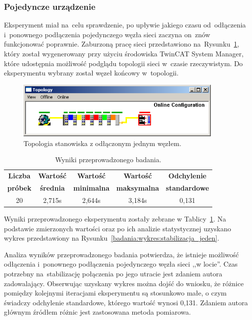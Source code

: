 \clearpage
\subsubsection{Pojedyncze urządzenie}
Eksperyment miał na~celu sprawdzenie, po upływie jakiego czasu od~odłączenia i~ponownego podłączenia pojedynczego węzła sieci zaczyna on~znów funkcjonować poprawnie. Zaburzoną pracę sieci przedstawiono na~Rysunku~\ref{one_slave}, który został wygenerowany przy użyciu środowiska TwinCAT System Manager, które udostępnia możliwość podglądu topologii sieci w~czasie rzeczywistym. Do eksperymentu wybrany został węzeł końcowy w~topologii.
\begin{figure}[!htb] 	\centering 	\includegraphics[width=0.9\textwidth]{images/topologyCXerror} \caption{Topologia stanowiska z odłączonym jednym węzłem.} \label{one_slave} \end{figure}

\begin{table}[!htb]
\begin{center}
\begin{tabular}{| c | c | c | c | c |}\hline
\textbf{Liczba} & \textbf{Wartość} & \textbf{Wartość} & \textbf{Wartość} & \textbf{Odchylenie} \\
\textbf{próbek} & \textbf{średnia} & \textbf{minimalna} & \textbf{maksymalna} & \textbf{standardowe} \\\hline\hline
20 & 2,715s & 2,644s & 3,184s & 0,131\\\hline
\end{tabular}
\end{center}
\vspace*{-6mm}
  \caption{Wyniki przeprowadzonego badania.}
	\label{badania:wyniki:stabilizacja_jeden}
\end{table}

\noindent Wyniki przeprowadzonego eksperymentu zostały zebrane w Tablicy~\ref{badania:wyniki:stabilizacja_jeden}. Na podstawie zmierzonych wartości oraz po ich analizie statystycznej uzyskano wykres przedstawiony na Rysunku~\ref{badania:wykres:stabilizacja_jeden}.

Analiza wyników przeprowadzonego badania potwierdza, że istnieje możliwość odłączenia i~ponownego podłączenia pojedynczego węzła sieci ,,w locie''. Czas potrzebny na~stabilizację połączenia po jego utracie jest zdaniem autora zadowalający. Obserwując uzyskany wykres można dojść do wniosku, że różnice pomiędzy kolejnymi iteracjami eksperymentu są stosunkowo małe, o czym świadczy odchylenie standardowe, którego wartość wynosi 0,131. Zdaniem autora głównym źródłem różnic jest zastosowana metoda pomiarowa.
\clearpage

